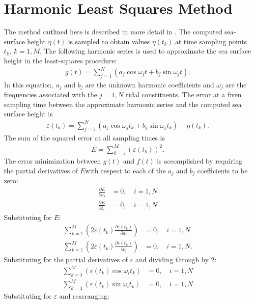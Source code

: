 \documentclass[11pt]{report}
\begin{document}
\section{Harmonic Least Squares Method}
The method outlined here is described in more detail in \cite{westerink_lsq}.
The computed sea-surface height $\eta(t)$ is sampled to obtain values $\eta(t_k)$ at time sampling points $t_k,~k=1,M$. The following harmonic series is used to approximate the sea surface height in the least-squares procedure:
\begin{align}
    g(t) = \sum_{j=1}^N(a_j\cos\omega_j t + b_j\sin\omega_j t).
\end{align}
In this equation, $a_j$ and $b_j$ are the unknown harmonic coefficients and $\omega_j$ are the frequencies associated with the $j=1,N$ tidal constituents. The error at a fiven sampling time between the approximate harmonic series and the computed sea surface height is
\begin{align}
    \varepsilon(t_k) = \sum_{j=1}^N(a_j\cos\omega_j t_k + b_j\sin\omega_j t_k) -\eta(t_k).
\end{align}
The sum of the squared error at all sampling times is
\begin{align}
    E = \sum_{k=1}^M\left(\varepsilon(t_k) \right)^2.
\end{align}
The error minimization between $g(t)$ and $f(t)$ is accomplished by requiring the partial derivatives of $E$with respect to each of the $a_j$ and $b_j$ coefficients to be zero:
\begin{align}
    \frac{\partial E}{\partial a_i} &= 0, \quad i=1,N \\
    \frac{\partial E}{\partial b_i} &= 0, \quad i=1,N
\end{align}
Substituting for $E$:
\begin{align}
    \sum_{k=1}^M \left(2\varepsilon(t_k)\frac{\partial \varepsilon(t_k)}{\partial a_i}\right) &= 0, \quad i=1,N \\
    \sum_{k=1}^M \left(2\varepsilon(t_k)\frac{\partial \varepsilon(t_k)}{\partial b_i}\right) &= 0, \quad i=1,N.
\end{align}
Substituting for the partial derivatives of $\varepsilon$ and dividing through by 2:
\begin{align}
    \sum_{k=1}^M \left(\varepsilon(t_k)\cos\omega_i t_k\right) &= 0, \quad i=1,N \\
    \sum_{k=1}^M \left(\varepsilon(t_k)\sin\omega_i t_k\right) &= 0, \quad i=1,N
\end{align}
Substituting for $\varepsilon$ and rearranging:
\end{document}
